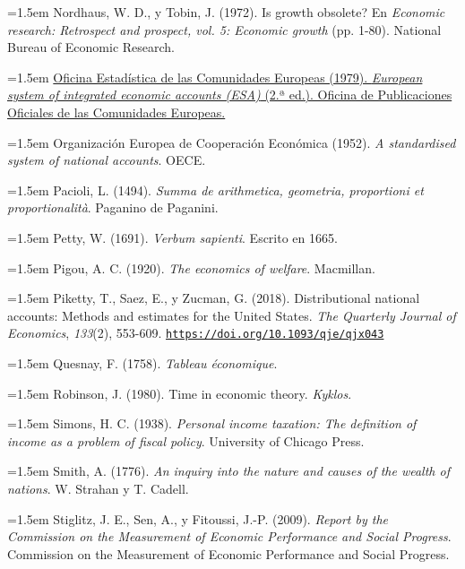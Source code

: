 \documentclass[10pt,a4paper]{article}
\begin{document}
\noindent\hangindent=1.5em Nordhaus, W. D., y Tobin, J. (1972). Is growth obsolete? En \textit{Economic research: Retrospect and prospect, vol. 5: Economic growth} (pp. 1-80). National Bureau of Economic Research.

\noindent\hangindent=1.5em \href{https://aei.pitt.edu/69006/}{Oficina Estadística de las Comunidades Europeas (1979). \textit{European system of integrated economic accounts (ESA)} (2.ª ed.). Oficina de Publicaciones Oficiales de las Comunidades Europeas.}

\noindent\hangindent=1.5em Organización Europea de Cooperación Económica (1952). \textit{A standardised system of national accounts}. OECE.

\noindent\hangindent=1.5em Pacioli, L. (1494). \textit{Summa de arithmetica, geometria, proportioni et proportionalità}. Paganino de Paganini.

\noindent\hangindent=1.5em Petty, W. (1691). \textit{Verbum sapienti}. Escrito en 1665.

\noindent\hangindent=1.5em Pigou, A. C. (1920). \textit{The economics of welfare}. Macmillan.

\noindent\hangindent=1.5em Piketty, T., Saez, E., y Zucman, G. (2018). Distributional national accounts: Methods and estimates for the United States. \textit{The Quarterly Journal of Economics}, \textit{133}(2), 553-609. \href{https://doi.org/10.1093/qje/qjx043}{\nolinkurl{https://doi.org/10.1093/qje/qjx043}}

\noindent\hangindent=1.5em Quesnay, F. (1758). \textit{Tableau économique}.

\noindent\hangindent=1.5em Robinson, J. (1980). Time in economic theory. \textit{Kyklos}.

\noindent\hangindent=1.5em Simons, H. C. (1938). \textit{Personal income taxation: The definition of income as a problem of fiscal policy}. University of Chicago Press.

\noindent\hangindent=1.5em Smith, A. (1776). \textit{An inquiry into the nature and causes of the wealth of nations}. W. Strahan y T. Cadell.

\noindent\hangindent=1.5em Stiglitz, J. E., Sen, A., y Fitoussi, J.-P. (2009). \textit{Report by the Commission on the Measurement of Economic Performance and Social Progress}. Commission on the Measurement of Economic Performance and Social Progress.
\end{document}
